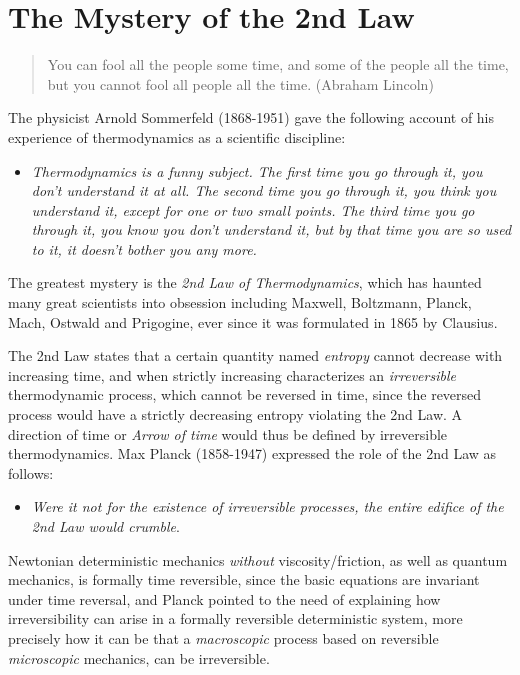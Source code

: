 \iffalse  %
\chapter{The Mystery of the 2nd Law}

\small



\begin{quote} You can fool all the people some time, 
and some of the people all the time, but you cannot fool
all people all the time. (Abraham Lincoln)
\end{quote}
\normalsize



The physicist Arnold Sommerfeld (1868-1951) gave the 
following account of his experience of thermodynamics 
as a scientific discipline:
\begin{itemize}
\item  
\emph{Thermodynamics is a funny subject. The first time you go through it, 
you don't understand it at all. The second time you go through it, you 
think you understand it, except for one or two small points. 
The third time you go through it, you know you don't understand it, 
but by that time you are so used to it, it doesn't bother you any more.} 
\end{itemize}
The greatest mystery is the \emph{2nd 
Law of Thermodynamics}, which has haunted
many great scientists into obsession including Maxwell, Boltzmann,
Planck, Mach, Ostwald and Prigogine, ever since it was formulated in 1865 by
Clausius.

The 2nd Law states that a certain quantity named \emph{entropy} 
cannot decrease with increasing time, and when strictly increasing 
characterizes an \emph{irreversible} thermodynamic process, 
which cannot be reversed in time, since the reversed process would
have a strictly decreasing entropy violating the 2nd Law.
A direction of time or \emph{Arrow of time} would thus be defined by 
irreversible thermodynamics.
Max Planck (1858-1947) expressed the role of the 2nd Law as follows: 
\begin{itemize}
\item \emph{Were it not for the 
existence of irreversible processes, the entire edifice
of the 2nd Law would crumble}.
\end{itemize}
Newtonian deterministic mechanics \emph{without} viscosity/friction, 
as well as quantum 
mechanics, is formally time reversible, since the basic equations are invariant
under time reversal, and Planck pointed to the need of  
explaining how irreversibility can arise in a formally reversible 
deterministic system,  more precisely how it can be that
a \emph{macroscopic} process based on reversible \emph{microscopic} mechanics, 
can be irreversible.

